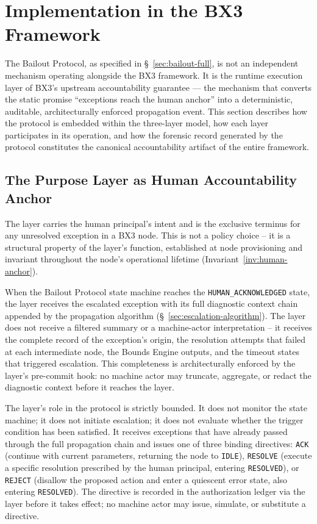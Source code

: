 \section{Implementation in the BX3 Framework}\label{sec:bailout-implementation}

The Bailout Protocol, as specified in \S~\ref{sec:bailout-full}, is not an
independent mechanism operating alongside the BX3 framework.  It is the
runtime execution layer of BX3's upstream accountability guarantee ---
the mechanism that converts the static promise ``exceptions reach the human
anchor'' into a deterministic, auditable, architecturally enforced propagation
event.  This section describes how the protocol is embedded within the three-layer
model, how each layer participates in its operation, and how the forensic record
generated by the protocol constitutes the canonical accountability artifact of
the entire framework.

\subsection{The Purpose Layer as Human Accountability Anchor}\label{sec:bailout-purpose-layer}

The \purpose{} layer carries the human principal's intent and is the exclusive
terminus for any unresolved exception in a BX3 node.  This is not a policy
choice -- it is a structural property of the layer's function, established at
node provisioning and invariant throughout the node's operational lifetime
(Invariant~\ref{inv:human-anchor}).

When the Bailout Protocol state machine reaches the \texttt{HUMAN\_ACKNOWLEDGED}
state, the \purpose{} layer receives the escalated exception with its full
diagnostic context chain appended by the propagation algorithm
(\S~\ref{sec:escalation-algorithm}).  The layer does not receive a filtered
summary or a machine-actor interpretation -- it receives the complete record
of the exception's origin, the resolution attempts that failed at each
intermediate node, the Bounds Engine outputs, and the timeout states that
triggered escalation.  This completeness is architecturally enforced by the
\fact{} layer's pre-commit hook: no machine actor may truncate, aggregate, or
redact the diagnostic context before it reaches the \purpose{} layer.

The \purpose{} layer's role in the protocol is strictly bounded.  It does not
monitor the state machine; it does not initiate escalation; it does not evaluate
whether the trigger condition has been satisfied.  It receives exceptions that
have already passed through the full propagation chain and issues one of three
binding directives: \texttt{ACK} (continue with current parameters, returning the
node to \texttt{IDLE}), \texttt{RESOLVE} (execute a specific resolution prescribed
by the human principal, entering \texttt{RESOLVED}), or \texttt{REJECT}
(disallow the proposed action and enter a quiescent error state, also entering
\texttt{RESOLVED}).  The directive is recorded in the authorization ledger via
the \fact{} layer before it takes effect; no machine actor may issue,
simulate, or substitute a directive.

